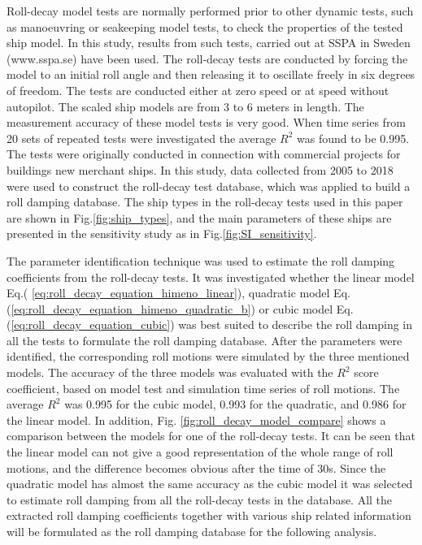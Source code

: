 Roll-decay model tests are normally performed prior to other dynamic tests, such as manoeuvring or seakeeping model tests, to check the properties of the tested ship model. In this study, results from such tests, carried out at SSPA in Sweden (www.sspa.se) have been used. The roll-decay tests are conducted by forcing the model to an initial roll angle and then releasing it to oscillate freely in six degrees of freedom. The tests are conducted either  at zero speed or at speed without autopilot. The scaled ship models are from 3 to 6 meters in  length. The measurement accuracy of these model tests is very good. When time series from 20 sets of repeated tests were investigated the average $R^2$ was found to be 0.995. The tests were originally conducted in connection with commercial projects for buildings new merchant ships. In this study, data collected from 2005 to 2018 were used to construct the roll-decay test database, which was applied to build a roll damping database. The ship types in the roll-decay tests used in this paper are  shown in Fig.\ref{fig:ship_types}, and the main parameters of these ships are presented in the sensitivity study as in Fig.\ref{fig:SI_sensitivity}. 


The parameter identification technique was used to estimate the roll damping coefficients from the roll-decay tests. It was investigated whether the linear model Eq.( \ref{eq:roll_decay_equation_himeno_linear}), quadratic model Eq.(\ref{eq:roll_decay_equation_himeno_quadratic_b}) or cubic model Eq.(\ref{eq:roll_decay_equation_cubic}) was best suited to describe the roll damping in all the tests to formulate the roll damping database. After the parameters were identified, the corresponding roll motions were simulated by the three mentioned models. The accuracy of the three models was evaluated with the $R^2$ score coefficient, based on model test and simulation time series of roll motions.
The average $R^2$ was 0.995 for the cubic model, 0.993 for the quadratic, and 0.986 for the linear model. In addition, Fig. \ref{fig:roll_decay_model_compare} shows a comparison between the models for one of the roll-decay tests. It can be seen that the linear model can not give a good representation of the whole range of roll motions, and the difference becomes obvious after the time of 30s. Since the quadratic model has almost the same accuracy as the cubic model it was selected to estimate roll damping from all the roll-decay tests in the database. All the extracted roll damping coefficients together with various ship related information will be formulated as the roll damping database for the following analysis.

